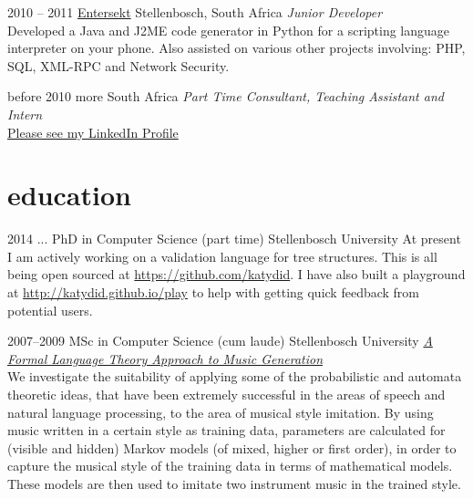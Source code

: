 \documentclass[print]{friggeri-cv} %
\begin{document}
\begin{entrylist}
\entry
{2010 -- 2011}
{\href{https://www.entersekt.com/}{Entersekt}}
{Stellenbosch, South Africa}
{\emph{Junior Developer} \\
Developed a Java and J2ME code generator in Python for a scripting language interpreter on your phone.
Also assisted on various other projects involving: PHP, SQL, XML-RPC and Network Security.}

\entry
{before 2010}
{more}
{South Africa}
{\emph{Part Time Consultant, Teaching Assistant and Intern} \\
\href{https://za.linkedin.com/in/schulzewalter}{Please see my LinkedIn Profile}
}

\end{entrylist}

\newpage

\section{education}


\begin{entrylist}

\entry
{2014 ...}
{PhD {\normalfont in Computer Science} (part time)}
{Stellenbosch University}
{At present I am actively working on a validation language for tree structures.
This is all being open sourced at \href{https://github.com/katydid}{https://github.com/katydid}.
I have also built a playground at \href{http://katydid.github.io/play}{http://katydid.github.io/play} to help with getting quick feedback from potential users.}

\entry
{2007--2009}
{MSc {\normalfont in Computer Science} (cum laude)}
{Stellenbosch University}
{\href{http://superwillow.sourceforge.net/}{\emph{A Formal Language Theory Approach to Music Generation}} \\ We investigate the suitability of applying some of the probabilistic and automata theoretic ideas, that have been extremely successful in the areas of speech and natural language processing, to the area of musical style imitation. By using music written in a certain style as training data, parameters are calculated for (visible and hidden) Markov models (of mixed, higher or first order), in order to capture the musical style of the training data in terms of mathematical models. These models are then used to imitate two instrument music in the trained style.}

\end{entrylist}
\end{document}
